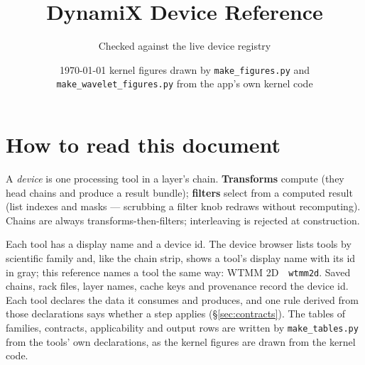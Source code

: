 \documentclass[10pt]{article}
\title{\textbf{DynamiX Device Reference}}
\author{Checked against the live device registry}
\date{\today \;\textperiodcentered\; kernel figures drawn by \texttt{make\_figures.py} and \texttt{make\_wavelet\_figures.py} from the app's own kernel code}
\newcommand{\dev}[1]{\texttt{#1}}
\newcommand{\tool}[2]{#1~\textperiodcentered~\dev{#2}}
\begin{document}
\maketitle

\section*{How to read this document}

A \emph{device} is one processing tool in a layer's chain. \textbf{Transforms} compute
(they head chains and produce a result bundle); \textbf{filters} select from a computed
result (list indexes and masks --- scrubbing a filter knob redraws without recomputing).
Chains are always transforms-then-filters; interleaving is rejected at construction.

Each tool has a display name and a device id. The device browser lists tools by scientific
family and, like the chain strip, shows a tool's display name with its id in gray; this reference
names a tool the same way: \tool{WTMM 2D}{wtmm2d}. Saved chains, rack files, layer
names, cache keys and provenance record the device id. Each tool declares the data it consumes
and produces, and one rule derived from those declarations says whether a step applies
(\S\ref{sec:contracts}). The tables of families, contracts, applicability and output rows are
written by \texttt{make\_tables.py} from the tools' own declarations, as the kernel figures are
drawn from the kernel code.
\end{document}

